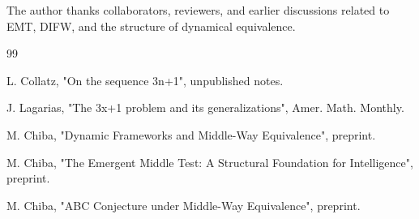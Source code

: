 \documentclass[11pt]{article}
\theoremstyle{definition}
\theoremstyle{remark}
\begin{document}
The author thanks collaborators, reviewers, and earlier discussions
related to EMT, DIFW, and the structure of dynamical equivalence.

\begin{thebibliography}{99}

L. Collatz, "On the sequence 3n+1", unpublished notes.

J. Lagarias, "The 3x+1 problem and its generalizations", Amer. Math.
Monthly.

M. Chiba, "Dynamic Frameworks and Middle-Way Equivalence", preprint.

M. Chiba, "The Emergent Middle Test: A Structural Foundation for
Intelligence", preprint.

M. Chiba, "ABC Conjecture under Middle-Way Equivalence", preprint.

\end{thebibliography}




\end{document}
